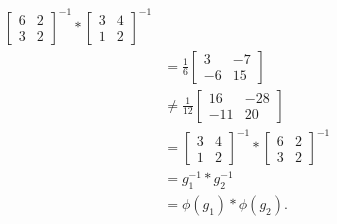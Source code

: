 \documentclass[
  coursecode={MTHE 418},
  assignmentname={Homework \homeworknumber},
  studentnumber=20053722,
  name={Bryan Hoang},
  draft,
]{
  ltxanswer%
}
\begin{document}
\begin{questions}
\begin{parts}
\begin{solution}
\begin{example}
\begin{align*}
\begin{bmatrix}
                                     6 & 2 \\
                                     3 & 2
                                   \end{bmatrix}^{-1} * \begin{bmatrix}
                                                          3 & 4 \\
                                                          1 & 2
                                                        \end{bmatrix}^{-1} \\
                                &= \frac{1}{6} \begin{bmatrix}
                                                 3  & -7 \\
                                                 -6 & 15
                                               \end{bmatrix}              \\
                                &\ne \frac{1}{12} \begin{bmatrix}
                                                    16  & -28 \\
                                                    -11 & 20
                                                  \end{bmatrix}           \\
                                &= \begin{bmatrix}
                                     3 & 4 \\
                                     1 & 2
                                   \end{bmatrix}^{-1} * \begin{bmatrix}
                                                          6 & 2 \\
                                                          3 & 2
                                                        \end{bmatrix}^{-1} \\
                                &= g_{1}^{-1} * g_{2}^{-1}                 \\
                                &= \phi(g_{1}) * \phi(g_{2}).
          \end{align*}
        \end{example}
      \end{solution}
    \end{parts}
  \end{questions}
\end{document}
